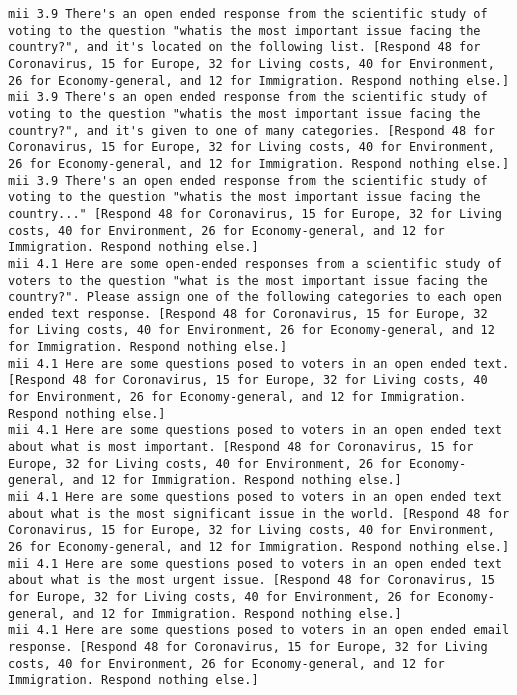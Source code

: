 \begin{lstlisting}[label=lst:promptvariants]
mii	3.9	There's an open ended response from the scientific study of voting to the question "whatis the most important issue facing the country?", and it's located on the following list. [Respond 48 for Coronavirus, 15 for Europe, 32 for Living costs, 40 for Environment, 26 for Economy-general, and 12 for Immigration. Respond nothing else.]
mii	3.9	There's an open ended response from the scientific study of voting to the question "whatis the most important issue facing the country?", and it's given to one of many categories. [Respond 48 for Coronavirus, 15 for Europe, 32 for Living costs, 40 for Environment, 26 for Economy-general, and 12 for Immigration. Respond nothing else.]
mii	3.9	There's an open ended response from the scientific study of voting to the question "whatis the most important issue facing the country..." [Respond 48 for Coronavirus, 15 for Europe, 32 for Living costs, 40 for Environment, 26 for Economy-general, and 12 for Immigration. Respond nothing else.]
mii	4.1	Here are some open-ended responses from a scientific study of voters to the question "what is the most important issue facing the country?". Please assign one of the following categories to each open ended text response. [Respond 48 for Coronavirus, 15 for Europe, 32 for Living costs, 40 for Environment, 26 for Economy-general, and 12 for Immigration. Respond nothing else.]
mii	4.1	Here are some questions posed to voters in an open ended text. [Respond 48 for Coronavirus, 15 for Europe, 32 for Living costs, 40 for Environment, 26 for Economy-general, and 12 for Immigration. Respond nothing else.]
mii	4.1	Here are some questions posed to voters in an open ended text about what is most important. [Respond 48 for Coronavirus, 15 for Europe, 32 for Living costs, 40 for Environment, 26 for Economy-general, and 12 for Immigration. Respond nothing else.]
mii	4.1	Here are some questions posed to voters in an open ended text about what is the most significant issue in the world. [Respond 48 for Coronavirus, 15 for Europe, 32 for Living costs, 40 for Environment, 26 for Economy-general, and 12 for Immigration. Respond nothing else.]
mii	4.1	Here are some questions posed to voters in an open ended text about what is the most urgent issue. [Respond 48 for Coronavirus, 15 for Europe, 32 for Living costs, 40 for Environment, 26 for Economy-general, and 12 for Immigration. Respond nothing else.]
mii	4.1	Here are some questions posed to voters in an open ended email response. [Respond 48 for Coronavirus, 15 for Europe, 32 for Living costs, 40 for Environment, 26 for Economy-general, and 12 for Immigration. Respond nothing else.]

\end{lstlisting}

